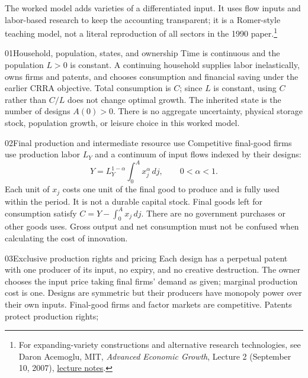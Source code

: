 The worked model adds varieties of a differentiated input. It uses flow inputs
and labor-based research to keep the accounting transparent; it is a
Romer-style teaching model, not a literal reproduction of all sectors in the
1990 paper.\footnote{For expanding-variety constructions and alternative
research technologies, see Daron Acemoglu, MIT, \textit{Advanced Economic Growth},
Lecture 2 (September 10, 2007),
\href{https://economics.mit.edu/sites/default/files/inline-files/Advanced\%20Economic\%20Growth\%20-\%20Lecture\%202\%2C\%20Review\%20of\%20Endogenous\%20Growth\%2C\%20Explaining\%20Variety\%20Models.pdf}{lecture notes}.}

\begin{modelsetup}[1]
\begin{modelcondition}{01}{Household, population, states, and ownership}
Time is continuous and the population $L>0$ is constant. A continuing household
supplies labor inelastically, owns firms and patents, and chooses consumption
and financial saving under the earlier CRRA objective. Total consumption is
$C$; since $L$ is constant, using $C$ rather than $C/L$ does not change optimal
growth. The inherited state is the number of designs $A(0)>0$. There is no
aggregate uncertainty, physical storage stock, population growth, or leisure
choice in this worked model.
\end{modelcondition}
\begin{modelcondition}{02}{Final production and intermediate resource use}
Competitive final-good firms use production labor $L_Y$ and a continuum of
input flows indexed by their designs:
\[
Y=L_Y^{1-\alpha}\int_0^A x_j^\alpha\,dj,\qquad 0<\alpha<1.
\]
Each unit of $x_j$ costs one unit of the final good to produce and is fully
used within the period. It is not a durable capital stock. Final goods left
for consumption satisfy $C=Y-\int_0^A x_j\,dj$. There are no government
purchases or other goods uses. Gross output and net consumption must not
be confused when calculating the cost of innovation.
\end{modelcondition}
\begin{modelcondition}{03}{Exclusive production rights and pricing}
Each design has a perpetual patent with one producer of its input, no expiry,
and no creative destruction. The owner chooses the input price taking final
firms' demand as given; marginal production cost is one. Designs are symmetric
but their producers have monopoly power over their own inputs. Final-good
firms and factor markets are competitive. Patents protect production rights;

\end{modelcondition}
\end{modelsetup}
